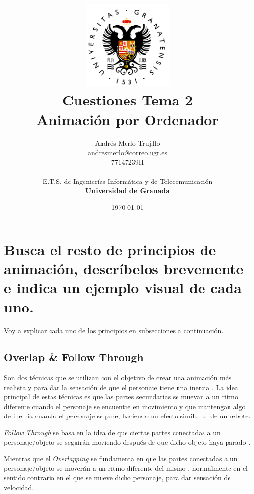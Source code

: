 \documentclass{article}
\title{
\includegraphics[width=1.75in]{imagenes/UGR-Logo.png} \\
\vspace*{1in}
\textbf{Cuestiones Tema 2} \\
Animación por Ordenador \\
\vspace*{0.5in}}
\author{Andrés Merlo Trujillo \\
andresmerlo@correo.ugr.es \\
77147239H \\ 
\vspace*{0.5in} \\
E.T.S. de Ingenierías Informática y de Telecomunicación \\
\textbf{Universidad de Granada}} \date{\today}
\begin{document}
\begin{titlingpage}
\maketitle
\end{titlingpage}

\tableofcontents

\newpage

\pagestyle{fancy}   %

\section{Busca el resto de principios de animación, descríbelos brevemente e indica un ejemplo visual de cada uno.}

Voy a explicar cada uno de los principios en subsecciones a continuación.

\subsection{Overlap \& Follow Through}

Son dos técnicas que se utilizan con el objetivo de crear una animación más realista y para dar la sensación de que el personaje tiene una inercia \cite{overlap}. La idea principal de estas técnicas es que las partes secundarias se muevan a un ritmo diferente cuando el personaje se encuentre en movimiento y que mantengan algo de inercia cuando el personaje se pare, haciendo un efecto similar al de un rebote.

\bigskip

\textit{Follow Through} se basa en la idea de que ciertas partes conectadas a un personaje/objeto se seguirán moviendo después de que dicho objeto haya parado \cite{overlap}.

\bigskip

Mientras que el \textit{Overlapping} se fundamenta en que las partes conectadas a un personaje/objeto se moverán a un ritmo diferente del mismo \cite{overlap}, normalmente en el sentido contrario en el que se mueve dicho personaje, para dar sensación de velocidad.
\end{document}
